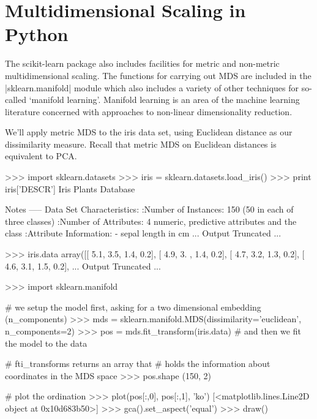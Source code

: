 



\section{Multidimensional Scaling in Python}

The scikit-learn package also includes facilities for metric and non-metric multidimensional scaling.  The functions for carrying out MDS are included in the |sklearn.manifold| module which also includes a variety of other techniques for so-called `manifold learning'.  Manifold learning is an area of the machine learning literature concerned with approaches to non-linear dimensionality reduction.

We'll apply metric MDS to the iris data set, using Euclidean distance as our dissimilarity measure.  Recall that metric MDS on Euclidean distances is equivalent to PCA.
%
\begin{python}
>>> import sklearn.datasets
>>> iris = sklearn.datasets.load_iris()
>>> print iris['DESCR']
Iris Plants Database

Notes
-----
Data Set Characteristics:
    :Number of Instances: 150 (50 in each of three classes)
    :Number of Attributes: 4 numeric, predictive attributes and the class
    :Attribute Information:
        - sepal length in cm
... Output Truncated ...

>>> iris.data
array([[ 5.1,  3.5,  1.4,  0.2],
       [ 4.9,  3. ,  1.4,  0.2],
       [ 4.7,  3.2,  1.3,  0.2],
       [ 4.6,  3.1,  1.5,  0.2],
... Output Truncated ...

>>> import sklearn.manifold

# we setup the model first, asking for a two dimensional embedding (n_components)
>>> mds = sklearn.manifold.MDS(dissimilarity='euclidean', n_components=2)  
>>> pos = mds.fit_transform(iris.data)  # and then we fit the model to the data

# fti_transforms returns an array that
# holds the information about coordinates in the MDS space
>>> pos.shape
(150, 2)

# plot the ordination
>>> plot(pos[:,0], pos[:,1], 'ko')
[<matplotlib.lines.Line2D object at 0x10d683b50>]
>>> gca().set_aspect('equal')
>>> draw()
\end{python}

